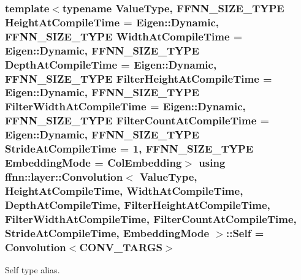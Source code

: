\hypertarget{classffnn_1_1layer_1_1_convolution_a5eb9cca724b3a80a83f9edb685e3178e}{
\subsubsection[{Self}]{\setlength{\rightskip}{0pt plus 5cm}template$<$typename Value\-Type, F\-F\-N\-N\-\_\-\-S\-I\-Z\-E\-\_\-\-T\-Y\-P\-E Height\-At\-Compile\-Time = Eigen\-::\-Dynamic, F\-F\-N\-N\-\_\-\-S\-I\-Z\-E\-\_\-\-T\-Y\-P\-E Width\-At\-Compile\-Time = Eigen\-::\-Dynamic, F\-F\-N\-N\-\_\-\-S\-I\-Z\-E\-\_\-\-T\-Y\-P\-E Depth\-At\-Compile\-Time = Eigen\-::\-Dynamic, F\-F\-N\-N\-\_\-\-S\-I\-Z\-E\-\_\-\-T\-Y\-P\-E Filter\-Height\-At\-Compile\-Time = Eigen\-::\-Dynamic, F\-F\-N\-N\-\_\-\-S\-I\-Z\-E\-\_\-\-T\-Y\-P\-E Filter\-Width\-At\-Compile\-Time = Eigen\-::\-Dynamic, F\-F\-N\-N\-\_\-\-S\-I\-Z\-E\-\_\-\-T\-Y\-P\-E Filter\-Count\-At\-Compile\-Time = Eigen\-::\-Dynamic, F\-F\-N\-N\-\_\-\-S\-I\-Z\-E\-\_\-\-T\-Y\-P\-E Stride\-At\-Compile\-Time = 1, F\-F\-N\-N\-\_\-\-S\-I\-Z\-E\-\_\-\-T\-Y\-P\-E Embedding\-Mode = Col\-Embedding$>$ using {\bf ffnn\-::layer\-::\-Convolution}$<$ Value\-Type, Height\-At\-Compile\-Time, Width\-At\-Compile\-Time, Depth\-At\-Compile\-Time, Filter\-Height\-At\-Compile\-Time, Filter\-Width\-At\-Compile\-Time, Filter\-Count\-At\-Compile\-Time, Stride\-At\-Compile\-Time, {\bf Embedding\-Mode} $>$\-::{\bf Self} =  {\bf Convolution}$<${\bf C\-O\-N\-V\-\_\-\-T\-A\-R\-G\-S}$>$}}\label{classffnn_1_1layer_1_1_convolution_a5eb9cca724b3a80a83f9edb685e3178e}


Self type alias. 

